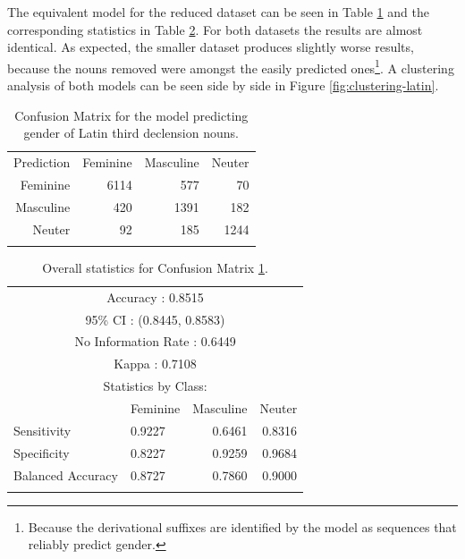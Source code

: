 The equivalent model for the reduced dataset can be seen in Table \ref{tab:gender-lat-2} and the corresponding statistics in Table \ref{tab:gender-lat-stats-2}. For both datasets the results are almost identical. As expected, the smaller dataset produces slightly worse results, because the nouns removed were amongst the easily predicted ones\footnote{Because the derivational suffixes are identified by the model as sequences that reliably predict gender.}. A clustering analysis of both models can be seen side by side in Figure \ref{fig:clustering-latin}.

\begin{table}[!htpb]
  \centering
  \begin{tabular}{rrrr}
    \lsptoprule
    \multicolumn{4}{c}{Reference}              \\
    \midrule
    Prediction & Feminine & Masculine & Neuter \\
    Feminine   & 6114     & 577       & 70     \\
    Masculine  & 420      & 1391      & 182    \\
    Neuter     & 92       & 185       & 1244   \\
    \lspbottomrule
  \end{tabular}
  \caption{Confusion Matrix for the model predicting gender of Latin third declension nouns.}\label{tab:gender-lat-2}
\end{table}

\begin{table}[!htpb]
  \centering
  \begin{tabular}{llrr}
    \lsptoprule
    \multicolumn{4}{c}{Overall statistics:} \\

    \midrule
    \multicolumn{4}{c}{Accuracy : 0.8515}             \\
    \multicolumn{4}{c}{95\% CI : (0.8445, 0.8583)}    \\
    \multicolumn{4}{c}{No Information Rate : 0.6449}  \\
    \multicolumn{4}{c}{Kappa : 0.7108}                \\
    \midrule
    \multicolumn{4}{c}{Statistics by Class:}          \\
    \midrule
                      & Feminine & Masculine & Neuter \\
    Sensitivity       & 0.9227   & 0.6461    & 0.8316 \\
    Specificity       & 0.8227   & 0.9259    & 0.9684 \\
    Balanced Accuracy & 0.8727   & 0.7860    & 0.9000 \\
    \lspbottomrule
  \end{tabular}
  \caption{Overall statistics for Confusion Matrix \ref{tab:gender-lat-2}.}\label{tab:gender-lat-stats-2}
\end{table}

